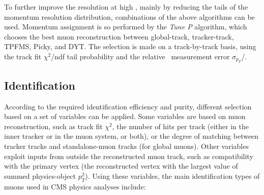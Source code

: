To further improve the resolution at high \pt, mainly by reducing the tails of the momentum resolution distribution, combinations of the above algorithms can be used. Momentum assignment is so performed by the \textit{Tune P} algorithm, which chooses the best muon reconstruction between global-track, tracker-track, TPFMS, Picky, and DYT. The selection is made on a track-by-track basis, using the track fit $\chi^2$/ndf tail probability and the relative \pt\ measurement error $\sigma_{p_T}$/\pt.
\subsection{Identification}
\label{sec:Identification}
\label{ID}
According to the required identification efficiency and purity, different selection based on a set of variables can be applied. Some variables are based on muon reconstruction,  such as track fit $\chi^2$, the number of hits per track (either in the inner tracker or in the muon system, or both), or the degree of matching between tracker tracks and standalone-muon tracks (for global muons). Other variables exploit inputs from outside the reconstructed muon track, such as compatibility with the primary vertex (the reconstructed vertex with the largest value of summed
physics-object $p_T^{2}$). Using these variables, the main identification types of muons used in CMS physics analyses include:
